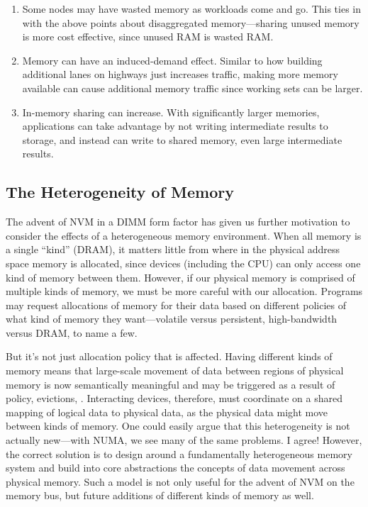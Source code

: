 \begin{enumerate}
    \item Some nodes may have wasted memory as workloads come and go. This ties in with the above points about
          disaggregated memory---sharing unused memory is more cost effective, since unused RAM is wasted RAM.
    \item Memory can have an induced-demand effect. Similar to how building additional lanes on highways just increases
          traffic, making more memory available can cause additional memory traffic since working sets can be larger.
    \item In-memory sharing can increase. With significantly larger memories, applications can take advantage by not
          writing intermediate results to storage, and instead can write to shared memory, even large intermediate results.
\end{enumerate}

\subsection{The Heterogeneity of Memory}

The advent of NVM in a DIMM form factor has given us further motivation to consider the effects of a heterogeneous
memory environment. When all memory is a single ``kind'' (\eg DRAM), it matters little from where in the physical
address space memory is allocated, since devices (including the CPU) can only access one kind of memory between
them. However, if our physical memory is comprised of multiple kinds of memory, we must be more careful with
our allocation. Programs may request allocations of memory for their data based on different policies of what kind of
memory they want---volatile versus persistent, high-bandwidth versus DRAM, to name a few.

But it's not just allocation policy that is affected. Having different kinds of memory means that large-scale movement
of data between regions of physical memory is now semantically meaningful and may be triggered as a result of policy,
evictions, \etc. Interacting devices, therefore, must coordinate on a shared mapping of logical data to physical data,
as the physical data might move between kinds of memory. One could easily argue that this heterogeneity is not actually
new---with NUMA, we see many of the same problems. I agree! However, the correct solution is to design around a
fundamentally heterogeneous memory system and build into core abstractions the concepts of data movement across physical
memory. Such a model is not only useful for the advent of NVM on the memory bus, but future additions of different kinds
of memory as well.

